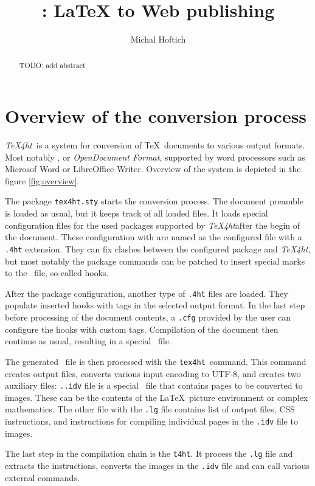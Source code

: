 \documentclass{ltugproc}
\author{Michal Hoftich}
\title{\texfourht: LaTeX to Web publishing}
\newcommand\term[1]{\textit{#1}}
\newcommand\command[1]{\texttt{#1}}
\newcommand\packagename[1]{\texttt{#1.sty}}
\newcommand\texfourht{\term{\TeX4ht}}
\newcommand\texfourhtcmd{\command{tex4ht}}
\newcommand\tfourhtcmd{\command{t4ht}}
\newcommand\extension[1]{\texttt{.#1}}
\begin{document}
\begin{abstract}
  TODO: add abstract
\end{abstract}
\maketitle

\section{Overview of the conversion process}
\texfourht\ is a system for conversion of \TeX\ documents to various output
formats. Most notably \HTML, or \term{OpenDocument Format}, supported by word processors such as Microsof Word or LibreOffice
Writer. Overview of the system is depicted in the figure \ref{fig:overview}.


The package \packagename{tex4ht} starts the conversion process. The document
preamble is loaded as usual, but it keeps track of all loaded files. 
It loads special configuration files for the
used packages supported by \texfourht after the begin of the document.
These configuration with are named as the configured file with a
\extension{4ht} extension.  They can fix clashes between the configured package
and \texfourht, but most notably the package commands can be patched to insert
special marks to the \DVI\ file, so-called
hooks. 

After the package configuration, another type of \extension{4ht} files are loaded.
They populate inserted hooks with tags in the selected output format. In the
last step before processing of the document contents, a \extension{cfg}
provided by the user can configure the hooks with custom tags. Compilation of
the document then continue as usual, resulting in a special \DVI\ file.

The generated \DVI\ file is then processed with the \texfourhtcmd\ command.
This command creates output files, converts various input encoding to UTF-8,
and creates two auxiliary files: \extension{.idv} file is a special \DVI\ file that contains
pages to be converted to images. These can be the contents of the \LaTeX\ picture
environment or complex mathematics. The other file with the \extension{lg}
file contains list of output files, CSS instructions, and instructions for
compiling individual pages in the  \extension{idv} file to images.

The last step in the compilation chain is the \tfourhtcmd.
It process the \extension{lg} file and extracts the  instructions,
converts the images in the \extension{idv} file and can call various external
commands.
\end{document}

